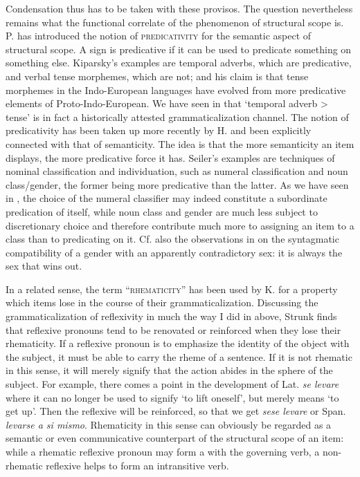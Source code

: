 Condensation thus has to be taken with these provisos. The question nevertheless remains what the functional correlate of the phenomenon of structural scope is. P. \citet{Kiparsky1968} has introduced the notion of \textsc{predicativity} for the semantic aspect of structural scope. A sign is predicative if it can be used to predicate something on something else. Kiparsky's examples are temporal adverbs, which are predicative, and verbal tense morphemes, which are not; and his claim is that tense morphemes in the Indo-European languages have evolved from more predicative elements of Proto-Indo-European. We have seen in  that ‘temporal adverb {\textgreater} tense’ is in fact a historically attested grammaticalization channel. The notion of predicativity has been taken up more recently by H. \citet{Seiler1982} and been explicitly connected with that of semanticity. The idea is that the more semanticity an item displays, the more predicative force it has. Seiler's examples are techniques of nominal classification and individuation, such as numeral classification and noun class/gender, the former being more predicative than the latter. As we have seen in , the choice of the numeral classifier may indeed constitute a subordinate predication of itself, while noun class and gender are much less subject to discretionary choice and therefore contribute much more to assigning an item to a class than to predicating on it. Cf. also the observations in  on the syntagmatic compatibility of a gender with an apparently contradictory sex: it is always the sex that wins out.

In a related sense, the term ``\textsc{rhematicity}'' has been used by K. \citet{Strunk1980} for a property which items lose in the course of their grammaticalization. Discussing the grammaticalization of reflexivity in much the way I did in  above, Strunk finds that reflexive pronouns tend to be renovated or reinforced when they lose their rhematicity. If a reflexive pronoun is to emphasize the identity of the object with the subject, it must be able to carry the rheme of a sentence. If it is not rhematic in this sense, it will merely signify that the action abides in the sphere of the subject. For example, there comes a point in the development of Lat. \textit{se levare} where it can no longer be used to signify ‘to lift oneself’, but merely means ‘to get up’. Then the reflexive will be reinforced, so that we get \textit{sese levare} or Span. \textit{levarse a si mismo}. Rhematicity in this sense can obviously be regarded as a semantic or even communicative counterpart of the structural scope of an item: while a rhematic reflexive pronoun may form a \vp with the governing verb, a non-rhematic reflexive helps to form an intransitive verb.

